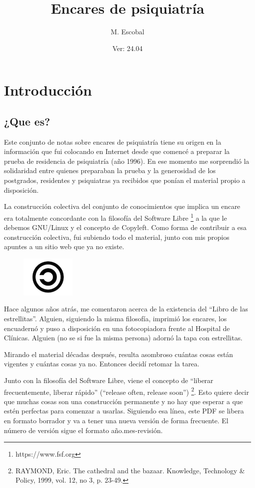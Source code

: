 \documentclass{scrbook}
\title{Encares de psiquiatría}
\author{M. Escobal}
\date{Ver: 24.04}
\begin{document}
\maketitle
\tableofcontents
\part{Introducción}
\chapter{¿Que es?}
Este conjunto de notas sobre encares de psiquiatría tiene su origen en la información que fui colocando en Internet desde que comencé a preparar la prueba de residencia de psiquiatría (año 1996). En ese momento me sorprendió la solidaridad entre quienes preparaban la prueba y la generosidad de los postgrados, residentes y psiquiatras ya recibidos que ponían el material propio a disposición.

La construcción colectiva del conjunto de conocimientos que implica un encare era totalmente concordante con la filosofía del Software Libre \footnote{https://www.fsf.org} a la que le debemos GNU/Linux y el concepto de Copyleft. Como forma de contribuir a esa construcción colectiva, fui subiendo todo el material, junto con mis propios apuntes a un sitio web que ya no existe.

\begin{figure}
	\centering
	\includegraphics{copyleft.png}
\end{figure}
Hace algunos años atrás, me comentaron acerca de la existencia del ``Libro de las estrellitas''. Alguien, siguiendo la misma filosofía, imprimió los encares, los encuadernó y puso a disposición en una fotocopiadora frente al Hospital de Clínicas. Alguien (no se si fue la misma persona) adornó la tapa con estrellitas.

Mirando el material décadas después, resulta asombroso cuántas cosas están vigentes y cuántas cosas ya no. Entonces decidí retomar la tarea.

Junto con la filosofía del Software Libre, viene el concepto de ``liberar frecuentemente, liberar rápido'' (``release often, release soon'') \footnote{RAYMOND, Eric. The cathedral and the bazaar. Knowledge, Technology \& Policy, 1999, vol. 12, no 3, p. 23-49.}. Esto quiere decir que muchas cosas son una construcción permanente y no hay que esperar a que estén perfectas para comenzar a usarlas. Siguiendo esa línea, este PDF se libera en formato borrador y va a tener una nueva versión de forma frecuente. El número de versión sigue el formato año.mes-revisión.
\end{document}
